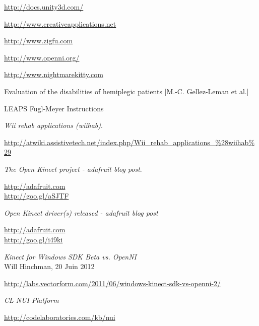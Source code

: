 \begin{thebibliography}{9}


  \url{http://docs.unity3d.com/}

  \url{http://www.creativeapplications.net}
  
  \url{http://www.zigfu.com}

  \url{http://www.openni.org/}

  \url{http://www.nightmarekitty.com }

  Evaluation of the disabilities of hemiplegic patients [M.-C. Gellez-Leman et al.]
  
  LEAPS Fugl-Meyer Instructions

  \emph{Wii rehab applications (wiihab)}.\\
  \begin{small}
  \url{http://atwiki.assistivetech.net/index.php/Wii_rehab_applications_\%28wiihab\%29}
  \end{small}
  
  \emph{The Open Kinect project - adafruit blog post}. \\
  \begin{small}
  \url{http://adafruit.com}\\
  \url{http://goo.gl/aSJTF}
  \end{small}

  \emph{Open Kinect driver(s) released - adafruit blog post}\\
  \begin{small}
  \url{http://adafruit.com}\\
  \url{http://goo.gl/i49ki}
  \end{small}

  \emph{Kinect for Windows SDK Beta vs. OpenNI}\\
  Will Hinchman, 20 Juin 2012\\
  \begin{small}
  \url{http://labs.vectorform.com/2011/06/windows-kinect-sdk-vs-openni-2/}
  \end{small}
  
  \emph{CL NUI Platform}\\
  \begin{small}
  \url{http://codelaboratories.com/kb/nui}
  \end{small}
  

\end{thebibliography}
